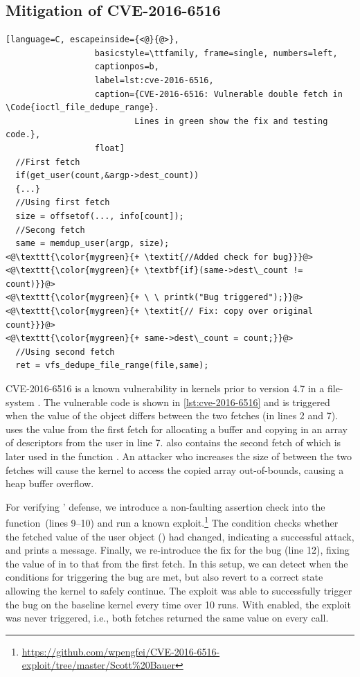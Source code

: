 \subsection{Mitigation of CVE-2016-6516}

\begin{lstlisting}[language=C, escapeinside={<@}{@>},
                  basicstyle=\ttfamily, frame=single, numbers=left,
                  captionpos=b,
                  label=lst:cve-2016-6516,
                  caption={CVE-2016-6516: Vulnerable double fetch in \Code{ioctl_file_dedupe_range}.
                          Lines in green show the fix and testing code.},
                  float]
  //First fetch
  if(get_user(count,&argp->dest_count))
  {...}
  //Using first fetch
  size = offsetof(..., info[count]);
  //Secong fetch
  same = memdup_user(argp, size);
<@\texttt{\color{mygreen}{+ \textit{//Added check for bug}}}@>
<@\texttt{\color{mygreen}{+ \textbf{if}(same->dest\_count != count)}}@>
<@\texttt{\color{mygreen}{+ \ \ printk("Bug triggered");}}@>
<@\texttt{\color{mygreen}{+ \textit{// Fix: copy over original count}}}@>
<@\texttt{\color{mygreen}{+ same->dest\_count = count;}}@>
  //Using second fetch
  ret = vfs_dedupe_file_range(file,same);
\end{lstlisting}

CVE-2016-6516 is a known vulnerability in kernels prior to version
4.7 in a file-system .
The vulnerable code is shown in \autoref{lst:cve-2016-6516} and is
triggered when the value of the  object differs between
the two fetches (in lines 2 and 7).
 uses the value from the first fetch for allocating a buffer
and copying in an array of descriptors from the user in line 7.
 also contains the second fetch of 
which is later used in the function .
An attacker who increases the size of  between the
two fetches will cause the kernel to access the copied array out-of-bounds,
causing a heap buffer overflow.

For verifying \midas' defense, we introduce a non-faulting assertion
check into the function~(lines 9--10) and run a known
exploit.\footnote{\url{https://github.com/wpengfei/CVE-2016-6516-exploit/tree/master/Scott\%20Bauer}}
The condition checks whether the fetched value of the user object ()
had changed, indicating a successful attack, and prints a message.
Finally, we re-introduce the fix for the bug (line 12), fixing the value of
 in  to that from the first fetch.
In this setup, we can detect when the conditions for triggering the bug are met,
but also revert to a correct state allowing the kernel to safely
continue.
The exploit was able to successfully trigger the bug on the baseline kernel
every time over 10 runs.
With \midas enabled, the exploit was never triggered, i.e., both fetches
returned the same value on every call.\\


